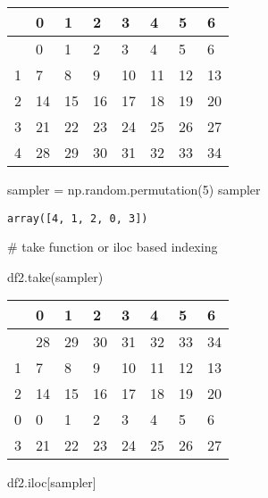 \documentclass[
  letterpaper,
  DIV=11,
  numbers=noendperiod]{scrreprt}
\newenvironment{Shaded}{\begin{snugshade}}{\end{snugshade}}
\newcommand{\CommentTok}[1]{\textcolor[rgb]{0.37,0.37,0.37}{#1}}
\newcommand{\DecValTok}[1]{\textcolor[rgb]{0.68,0.00,0.00}{#1}}
\newcommand{\NormalTok}[1]{\textcolor[rgb]{0.00,0.23,0.31}{#1}}
\newcommand{\OperatorTok}[1]{\textcolor[rgb]{0.37,0.37,0.37}{#1}}
\begin{document}
\begin{longtable}[]{@{}llllllll@{}}
\toprule\noalign{}
& 0 & 1 & 2 & 3 & 4 & 5 & 6 \\
\midrule\noalign{}
\endhead
\bottomrule\noalign{}
\endlastfoot
0 & 0 & 1 & 2 & 3 & 4 & 5 & 6 \\
1 & 7 & 8 & 9 & 10 & 11 & 12 & 13 \\
2 & 14 & 15 & 16 & 17 & 18 & 19 & 20 \\
3 & 21 & 22 & 23 & 24 & 25 & 26 & 27 \\
4 & 28 & 29 & 30 & 31 & 32 & 33 & 34 \\
\end{longtable}

\begin{Shaded}
\begin{Highlighting}[]
\NormalTok{sampler }\OperatorTok{=}\NormalTok{ np.random.permutation(}\DecValTok{5}\NormalTok{)}
\NormalTok{sampler}
\end{Highlighting}
\end{Shaded}

\begin{verbatim}
array([4, 1, 2, 0, 3])
\end{verbatim}

\begin{Shaded}
\begin{Highlighting}[]
\CommentTok{\# take function or \textquotesingle{}iloc\textquotesingle{} based indexing}

\NormalTok{df2.take(sampler)}
\end{Highlighting}
\end{Shaded}

\begin{longtable}[]{@{}llllllll@{}}
\toprule\noalign{}
& 0 & 1 & 2 & 3 & 4 & 5 & 6 \\
\midrule\noalign{}
\endhead
\bottomrule\noalign{}
\endlastfoot
4 & 28 & 29 & 30 & 31 & 32 & 33 & 34 \\
1 & 7 & 8 & 9 & 10 & 11 & 12 & 13 \\
2 & 14 & 15 & 16 & 17 & 18 & 19 & 20 \\
0 & 0 & 1 & 2 & 3 & 4 & 5 & 6 \\
3 & 21 & 22 & 23 & 24 & 25 & 26 & 27 \\
\end{longtable}

\begin{Shaded}
\begin{Highlighting}[]
\NormalTok{df2.iloc[sampler]}
\end{Highlighting}
\end{Shaded}
\end{document}

